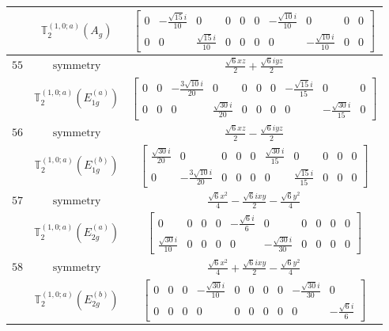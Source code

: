 \documentclass[fleqn,8pt,landscape]{jsarticle}
\begin{document}
\begin{longtable}{ccc}
$  $ & $ \mathbb{T}_{2}^{(1,0;a)}(A_{g}) $ & $ \begin{bmatrix} 0 & - \frac{\sqrt{15} i}{10} & 0 & 0 & 0 & 0 & - \frac{\sqrt{10} i}{10} & 0 & 0 & 0 \\ 0 & 0 & \frac{\sqrt{15} i}{10} & 0 & 0 & 0 & 0 & - \frac{\sqrt{10} i}{10} & 0 & 0 \end{bmatrix} $ \\ \hline
$ 55 $ & $ \text{symmetry} $ & $ \frac{\sqrt{6} x z}{2} + \frac{\sqrt{6} i y z}{2} $ \\
$  $ & $ \mathbb{T}_{2}^{(1,0;a)}(E_{1g}^{(a)}) $ & $ \begin{bmatrix} 0 & 0 & - \frac{3 \sqrt{10} i}{20} & 0 & 0 & 0 & 0 & - \frac{\sqrt{15} i}{15} & 0 & 0 \\ 0 & 0 & 0 & \frac{\sqrt{30} i}{20} & 0 & 0 & 0 & 0 & - \frac{\sqrt{30} i}{15} & 0 \end{bmatrix} $ \\ \hline
$ 56 $ & $ \text{symmetry} $ & $ \frac{\sqrt{6} x z}{2} - \frac{\sqrt{6} i y z}{2} $ \\
$  $ & $ \mathbb{T}_{2}^{(1,0;a)}(E_{1g}^{(b)}) $ & $ \begin{bmatrix} \frac{\sqrt{30} i}{20} & 0 & 0 & 0 & 0 & \frac{\sqrt{30} i}{15} & 0 & 0 & 0 & 0 \\ 0 & - \frac{3 \sqrt{10} i}{20} & 0 & 0 & 0 & 0 & \frac{\sqrt{15} i}{15} & 0 & 0 & 0 \end{bmatrix} $ \\ \hline
$ 57 $ & $ \text{symmetry} $ & $ \frac{\sqrt{6} x^{2}}{4} - \frac{\sqrt{6} i x y}{2} - \frac{\sqrt{6} y^{2}}{4} $ \\
$  $ & $ \mathbb{T}_{2}^{(1,0;a)}(E_{2g}^{(a)}) $ & $ \begin{bmatrix} 0 & 0 & 0 & 0 & - \frac{\sqrt{6} i}{6} & 0 & 0 & 0 & 0 & 0 \\ \frac{\sqrt{30} i}{10} & 0 & 0 & 0 & 0 & - \frac{\sqrt{30} i}{30} & 0 & 0 & 0 & 0 \end{bmatrix} $ \\ \hline
$ 58 $ & $ \text{symmetry} $ & $ \frac{\sqrt{6} x^{2}}{4} + \frac{\sqrt{6} i x y}{2} - \frac{\sqrt{6} y^{2}}{4} $ \\
$  $ & $ \mathbb{T}_{2}^{(1,0;a)}(E_{2g}^{(b)}) $ & $ \begin{bmatrix} 0 & 0 & 0 & - \frac{\sqrt{30} i}{10} & 0 & 0 & 0 & 0 & - \frac{\sqrt{30} i}{30} & 0 \\ 0 & 0 & 0 & 0 & 0 & 0 & 0 & 0 & 0 & - \frac{\sqrt{6} i}{6} \end{bmatrix} $ \\ \hline

\end{longtable}
\end{document}
